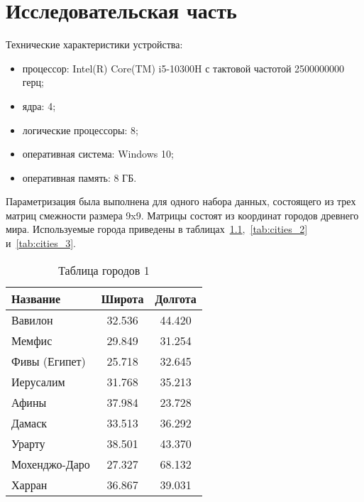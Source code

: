 \chapter{Исследовательская часть}

Технические характеристики устройства:
\begin{itemize}
    \item процессор: Intel(R) Core(TM) i5-10300H с тактовой частотой 2500000000 герц;
	\item ядра:	4;
	\item логические процессоры:	8;
    \item оперативная система: Windows 10;
    \item оперативная память: 8 ГБ.
\end{itemize}

Параметризация была выполнена для одного набора данных, состоящего из трех матриц смежности размера 9x9. Матрицы состоят из координат городов древнего мира. Используемые города приведены в таблицах~\ref{tab:cities_1},~\ref{tab:cities_2} и~\ref{tab:cities_3}.

\begin{table}[H]
\centering
\caption{Таблица городов 1\label{tab:cities_1}}
\begin{tabular}{|l|c|c|}
\hline
\textbf{Название}         & \textbf{Широта} & \textbf{Долгота} \\ \hline
Вавилон                   & 32.536          & 44.420           \\ \hline
Мемфис                    & 29.849          & 31.254           \\ \hline
Фивы (Египет)             & 25.718          & 32.645           \\ \hline
Иерусалим                 & 31.768          & 35.213           \\ \hline
Афины                     & 37.984          & 23.728           \\ \hline
Дамаск                    & 33.513          & 36.292           \\ \hline
Урарту                    & 38.501          & 43.370           \\ \hline
Мохенджо-Даро             & 27.327          & 68.132           \\ \hline
Харран                    & 36.867          & 39.031           \\ \hline
\end{tabular}
\end{table}


